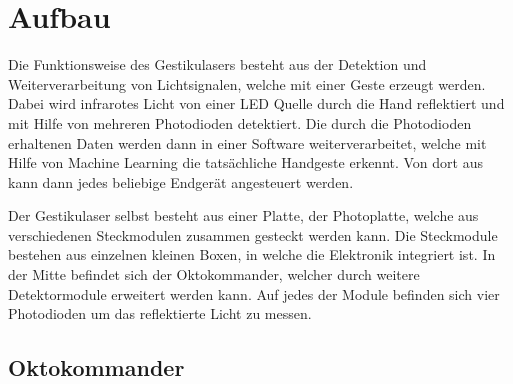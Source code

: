 \chapter{Aufbau}
\label{ch:Funktionsweise und Aufbau}
Die Funktionsweise des Gestikulasers besteht aus der Detektion und Weiterverarbeitung von Lichtsignalen, welche mit einer Geste erzeugt werden. Dabei wird infrarotes Licht von einer LED Quelle durch die Hand reflektiert und mit Hilfe von mehreren Photodioden detektiert. Die durch die Photodioden erhaltenen Daten werden dann in einer Software weiterverarbeitet, welche mit Hilfe von Machine Learning die tatsächliche Handgeste erkennt. Von dort aus kann dann jedes beliebige Endgerät angesteuert werden.

Der Gestikulaser selbst besteht aus einer Platte, der Photoplatte, welche aus verschiedenen Steckmodulen zusammen gesteckt werden kann. Die Steckmodule bestehen aus einzelnen kleinen Boxen, in welche die Elektronik integriert ist. In der Mitte befindet sich der Oktokommander, welcher durch weitere Detektormodule erweitert werden kann. Auf jedes der Module befinden sich vier Photodioden um das reflektierte Licht zu messen. 



\section{Oktokommander}
\label{sec:Oktokommander}

